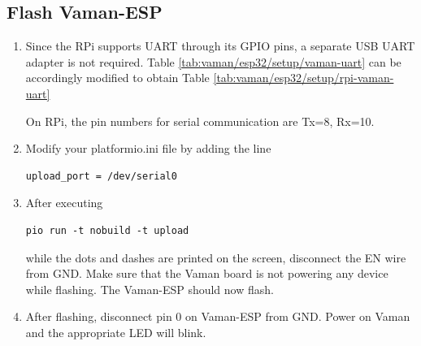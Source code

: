 \documentclass[journal,12pt,twocolumn]{IEEEtran}
\renewcommand\thesection{\arabic{section}}
\renewcommand\thesubsection{\thesection.\arabic{subsection}}
\begin{document}
\subsection{Flash Vaman-ESP}
\renewcommand{\theequation}{\theenumi}
\renewcommand{\thefigure}{\theenumi}
\begin{enumerate}[label=\thesubsection.\arabic*.,ref=\thesubsection.\theenumi]
\item Since the RPi supports UART through its GPIO pins, a separate USB UART adapter is not required.  Table 
		\ref{tab:vaman/esp32/setup/vaman-uart} can be accordingly modified to obtain Table 
		\ref{tab:vaman/esp32/setup/rpi-vaman-uart}
			\begin{table}[!h]
		
		\caption{}
		\label{tab:vaman/esp32/setup/rpi-vaman-uart}
	\end{table}
	On RPi, the pin numbers for serial communication are Tx=8, Rx=10.
\item Modify your platformio.ini file by adding the line 
\begin{lstlisting}
upload_port = /dev/serial0
\end{lstlisting}

\item After executing 
\begin{lstlisting}
pio run -t nobuild -t upload
\end{lstlisting}
while the dots and dashes are printed on the screen, disconnect the EN wire from GND.   Make sure that the Vaman board is not powering any device while flashing.  The Vaman-ESP should now flash.
\item After flashing, disconnect pin 0 on Vaman-ESP from GND. Power on Vaman and the appropriate LED will blink.
\end{enumerate}
\fi
\end{document}
